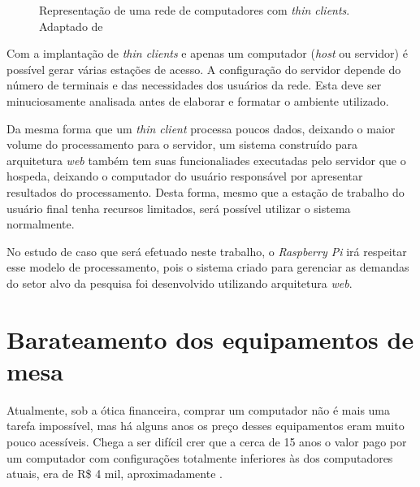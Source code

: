 \begin{figure}[ht]
    \centering
    \caption{Representação de uma rede de computadores com \textit{thin clients}. Adaptado de \cite{THINCLIENT}}
\end{figure}

Com a implantação de \textit{thin clients} e apenas um computador (\textit{host} ou servidor) é possível gerar várias estações de acesso. A configuração do servidor depende do número de terminais e das necessidades dos usuários da rede. Esta deve ser minuciosamente analisada antes de elaborar e formatar o ambiente utilizado.

Da mesma forma que um \textit{thin client} processa poucos dados, deixando o maior volume do processamento para o servidor, um sistema construído para arquitetura \textit{web} também tem suas funcionaliades executadas pelo servidor que o hospeda, deixando o computador do usuário responsável por apresentar resultados do processamento. Desta forma, mesmo que a estação de trabalho do usuário final tenha recursos limitados, será possível utilizar o sistema normalmente.

No estudo de caso que será efetuado neste trabalho, o \textit{Raspberry Pi} irá respeitar esse modelo de processamento, pois o sistema criado para gerenciar as demandas do setor alvo da pesquisa foi desenvolvido utilizando arquitetura \textit{web}.

\section{Barateamento dos equipamentos de mesa}

Atualmente, sob a ótica financeira, comprar um computador não é mais uma tarefa impossível, mas há alguns anos os preço desses equipamentos eram muito pouco acessíveis. Chega a ser difícil crer que a cerca de 15 anos o valor pago por um computador com configurações totalmente inferiores às dos computadores atuais, era de R\$ 4 mil, aproximadamente \cite{HAMANN}.

